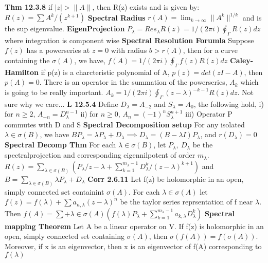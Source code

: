 \documentclass[8pt]{extarticle}
\theoremstyle{definition}
\begin{document}
\textbf{Thm 12.3.8} if $|z| > \|A\|$, then R(z) exists and is given by: $R(z) = \sum A^k/(z^{k+1})$
\textbf{Spectral Radius} $r(A) = \lim_{k\to \infty} \|A^k\|^{1/k}$ and is the sup eigenvalue.
\textbf{EigenProjection} $P_\lambda = Res_\lambda R(z) = 1/(2\pi i) \oint_\Gamma R(z)dz$ where integration is component wise
\textbf{Spectral Resolution Forumla} Suppose $f(z)$ has a powerseries at $z=0$ with radius $ b>r(A)$, then for a curve containing the $\sigma(A)$, we have, $f(A) = 1/(2\pi i) \oint_\Gamma f(z)R(z)dz$
\textbf{Caley-Hamilton} if p(z) is a charcteristic polynomial of A, $p(z) = det(zI-A)$, then $p(A)=0$.
There is an operator in the summation of the powerseries, $A_k$ which is going to be really important. 
$A_k = 1/(2 \pi i)\oint_\Gamma (z-\lambda)^{-k-1}R(z)dz$. Not sure why we care...
\textbf{L 12.5.4} Define $D_\lambda = A_{-2}$ and $S_\lambda = A_0$, the following hold, 
i) for $n \geq 2$, $A_{-n} = D_\lambda^{n-1}$ ii) for $n \geq 0$, $A_n = (-1)^nS_\lambda^{n+1}$
iii) Operator P commutes with D and S
\textbf{Spectral Decomposition setup} For any isolated $\lambda \in \sigma(B)$, we have $BP_\lambda = \lambda P_\lambda + D_\lambda \implies D_\lambda = (B-\lambda I)P_\lambda$, and $r(D_\lambda) = 0$
\textbf{Spectral Decomp Thm} For each $\lambda \in \sigma(B)$, let $P_\lambda,~D_\lambda$ be the spectralprojection and corresponding eigennilpotent of order $m_\lambda$. $R(z) = \sum_{\lambda \in \sigma(B)} (P_\lambda/z-\lambda + \sum_{k=1}^{m_\lambda-1} D_\lambda^k/(z-\lambda)^{k+1})$ and 
$B = \sum _{\lambda \in \sigma(B)} \lambda P_\lambda + D_\lambda$
\textbf{Corr 2.6.11} Let f(z) be holomorphic in an open, simply connected set containint $\sigma(A)$. For each $\lambda \in \sigma(A)$ let $f(z) = f(\lambda) + \sum a_{n,\lambda}(z-\lambda)^n$ be the taylor series reprsentation of f near $\lambda$. Then $f(A) = \sum+{\lambda \in \sigma(A)} (f(\lambda)P_\lambda + \sum _{k=1}^{m_\lambda-1}a_{k,\lambda}D^k_\lambda)$
\textbf{Spectral mapping Theorem} Let A be a linear operator on V. If f(z) is holomorphic in an open, simply connected set containing $\sigma(A)$, then $\sigma(f(A))=f(\sigma(A))$. Moreover, if x is an eigenvector, then x is an eigenvector of f(A) corresponding to $f(\lambda)$
\end{document}
